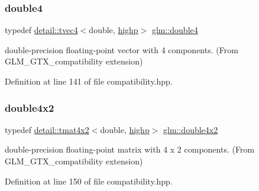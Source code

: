 \mbox{\label{group__gtx__compatibility_ga1edf736b418528a2fc87d826f7697b9d}} 
\subsubsection{\texorpdfstring{double4}{double4}}
{\footnotesize\ttfamily typedef \hyperlink{structglm_1_1detail_1_1tvec4}{detail\+::tvec4}$<$double, \hyperlink{namespaceglm_a0f04f086094c747d227af4425893f545ac6f7eab42eacbb10d59a58e95e362074}{highp}$>$ \hyperlink{group__gtx__compatibility_ga1edf736b418528a2fc87d826f7697b9d}{glm\+::double4}}



double-\/precision floating-\/point vector with 4 components. (From G\+L\+M\+\_\+\+G\+T\+X\+\_\+compatibility extension) 



Definition at line 141 of file compatibility.\+hpp.

\mbox{\label{group__gtx__compatibility_ga816d1a516a5ec13511fe1ae703ddcf94}} 
\subsubsection{\texorpdfstring{double4x2}{double4x2}}
{\footnotesize\ttfamily typedef \hyperlink{structglm_1_1detail_1_1tmat4x2}{detail\+::tmat4x2}$<$double, \hyperlink{namespaceglm_a0f04f086094c747d227af4425893f545ac6f7eab42eacbb10d59a58e95e362074}{highp}$>$ \hyperlink{group__gtx__compatibility_ga816d1a516a5ec13511fe1ae703ddcf94}{glm\+::double4x2}}



double-\/precision floating-\/point matrix with 4 x 2 components. (From G\+L\+M\+\_\+\+G\+T\+X\+\_\+compatibility extension) 



Definition at line 150 of file compatibility.\+hpp.

\mbox{\label{group__gtx__compatibility_ga1199ee41226db53d5f190d0628041845}} 
